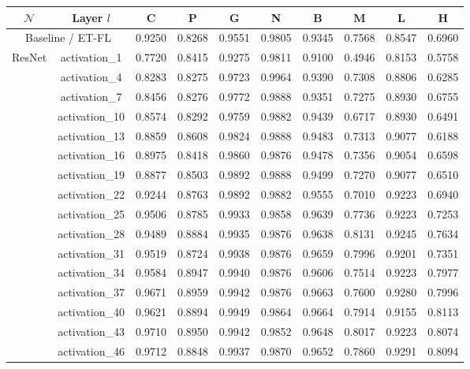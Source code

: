 \begin{table}
  \centering
  \scriptsize
  \begin{tabular}{|c|c|ccccc|ccc|}
    \hline
    $\mathcal{N}$ & \textbf{Layer $l$}  & \textbf{C} & \textbf{P} & \textbf{G} & \textbf{N} & \textbf{B} & \textbf{M} & \textbf{L} & \textbf{H} \\
    \hline
    \multicolumn{2}{|c|}{Baseline / ET-FL} & 0.9250 & 0.8268 & 0.9551 & 0.9805 & 0.9345 & 0.7568 & 0.8547 & 0.6960 \\
    \hline
    \multirow{17}{*}{ResNet} & activation\_1 & 0.7720 & 0.8415 & 0.9275 & 0.9811 & 0.9100 & 0.4946 & 0.8153 & 0.5758 \\
    & activation\_4 & 0.8283 & 0.8275 & 0.9723 & 0.9964 & 0.9390 & 0.7308 & 0.8806 & 0.6285 \\
    & activation\_7 & 0.8456 & 0.8276 & 0.9772 & 0.9888 & 0.9351 & 0.7275 & 0.8930 & 0.6755 \\
    & activation\_10 & 0.8574 & 0.8292 & 0.9759 & 0.9882 & 0.9439 & 0.6717 & 0.8930 & 0.6491 \\
    & activation\_13 & 0.8859 & 0.8608 & 0.9824 & 0.9888 & 0.9483 & 0.7313 & 0.9077 & 0.6188 \\
    & activation\_16 & 0.8975 & 0.8418 & 0.9860 & 0.9876 & 0.9478 & 0.7356 & 0.9054 & 0.6598 \\
    & activation\_19 & 0.8877 & 0.8503 & 0.9892 & 0.9888 & 0.9499 & 0.7270 & 0.9077 & 0.6510 \\
    & activation\_22 & 0.9244 & 0.8763 & 0.9892 & 0.9882 & 0.9555 & 0.7010 & 0.9223 & 0.6940 \\
    & activation\_25 & 0.9506 & 0.8785 & 0.9933 & 0.9858 & 0.9639 & 0.7736 & 0.9223 & 0.7253 \\
    & activation\_28 & 0.9489 & 0.8884 & 0.9935 & 0.9876 & 0.9638 & 0.8131 & 0.9245 & 0.7634 \\
    & activation\_31 & 0.9519 & 0.8724 & 0.9938 & 0.9876 & 0.9659 & 0.7996 & 0.9201 & 0.7351 \\
    & activation\_34 & 0.9584 & 0.8947 & 0.9940 & 0.9876 & 0.9606 & 0.7514 & 0.9223 & 0.7977 \\
    & activation\_37 & 0.9671 & 0.8959 & 0.9942 & 0.9876 & 0.9663 & 0.7600 & 0.9280 & 0.7996 \\
    & activation\_40 & 0.9621 & 0.8894 & 0.9949 & 0.9864 & 0.9664 & 0.7914 & 0.9155 & 0.8113 \\
    & activation\_43 & 0.9710 & 0.8950 & 0.9942 & 0.9852 & 0.9648 & 0.8017 & 0.9223 & 0.8074 \\
    & activation\_46 & 0.9712 & 0.8848 & 0.9937 & 0.9870 & 0.9652 & 0.7860 & 0.9291 & 0.8094 \\

\end{tabular}
\end{table}
